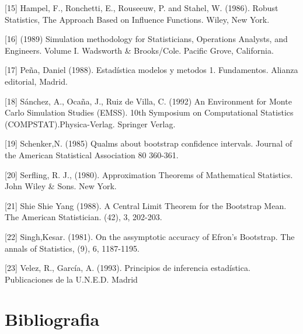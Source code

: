 \documentclass[
]{article}
\begin{document}
{[}15{]} Hampel, F., Ronchetti, E., Rouseeuw, P. and Stahel, W. (1986). Robust Statistics, The Approach Based on Influence Functions. Wiley, New York.

{[}16{]} (1989) Simulation methodology for Statisticians, Operations Analysts, and Engineers. Volume I. Wadsworth \& Brooks/Cole. Pacific Grove, California.

{[}17{]} Peña, Daniel (1988). Estadística modelos y metodos 1. Fundamentos. Alianza editorial, Madrid.

{[}18{]} Sánchez, A., Ocaña, J., Ruiz de Villa, C. (1992) An Environment for Monte Carlo Simulation Studies (EMSS). 10th Symposium on Computational Statistics (COMPSTAT).Physica-Verlag. Springer Verlag.

{[}19{]} Schenker,N. (1985) Qualms about bootstrap confidence intervals. Journal of the American Statistical Association 80 360-361.

{[}20{]} Serfling, R. J., (1980). Approximation Theorems of Mathematical Statistics. John Wiley \& Sons. New York.

{[}21{]} Shie Shie Yang (1988). A Central Limit Theorem for the Bootstrap Mean. The American Statistician. (42), 3, 202-203.

{[}22{]} Singh,Kesar. (1981). On the assymptotic accuracy of Efron's Bootstrap. The annals of Statistics, (9), 6, 1187-1195.

{[}23{]} Velez, R., García, A. (1993). Principios de inferencia estadística. Publicaciones de la U.N.E.D. Madrid

\newpage

\section*{Bibliografia}\label{bibliografia}
\end{document}
